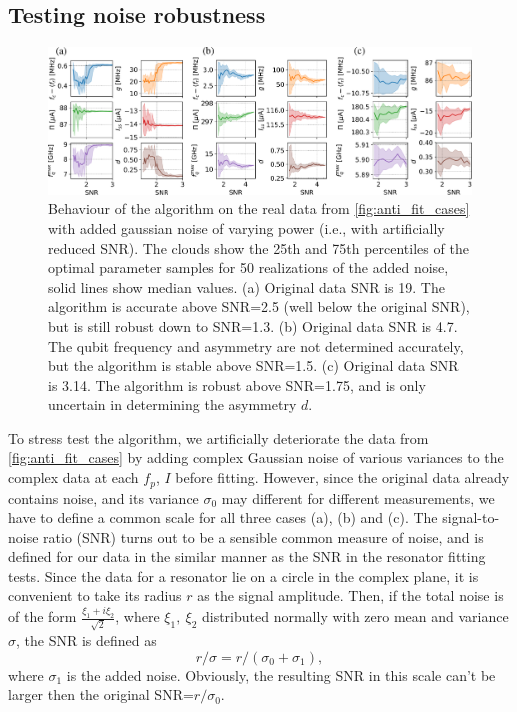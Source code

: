 \documentclass[%
 aip,
 draft,
 amsmath,amssymb,
 reprint,%
]{revtex4-1}
\begin{document}
\subsection{Testing noise robustness}

\begin{figure}
	\centering
	\includegraphics[width=\linewidth]{noise_test}
	\caption{Behaviour of the algorithm on the real data from \autoref{fig:anti_fit_cases} with added gaussian noise of varying power (i.e., with artificially reduced SNR). The clouds show the 25th and 75th percentiles of the optimal parameter samples for 50 realizations of the added noise, solid lines show median values. (a) Original data SNR is 19. The algorithm is accurate above SNR=2.5 (well below the original SNR), but is still robust down to SNR=1.3. (b) Original data SNR is 4.7. The qubit frequency and asymmetry are not determined accurately, but the algorithm is stable above SNR=1.5. (c) Original data SNR is 3.14. The algorithm is robust above SNR=1.75, and is only uncertain in determining the asymmetry $d$.}
	\label{fig:noise_test}
\end{figure}

To stress test the algorithm, we artificially deteriorate the data from \autoref{fig:anti_fit_cases} by adding complex Gaussian noise of various variances to the complex data at each $f_p$, $I$ before fitting. However, since the original data already contains noise, and its variance $\sigma_0$ may different for different measurements, we have to define a common scale for all three cases (a), (b) and (c). The signal-to-noise ratio (SNR) turns out to be a sensible common measure of noise, and is defined for our data in the similar manner as the SNR in the resonator fitting tests\cite{probst2015}. Since the data for a resonator lie on a circle in the complex plane, it is convenient to take its radius $r$ as the signal amplitude. Then, if the total noise is of the form $\frac{\xi_1+i\xi_2}{\sqrt 2}$, where $\xi_1,\ \xi_2$ distributed normally with zero mean and variance $\sigma$, the SNR is defined as 
\begin{equation}
r/\sigma = r/(\sigma_0+\sigma_1),
\label{eq:SNR}
\end{equation}
where $\sigma_1$ is the added noise. Obviously, the resulting SNR in this scale can't be larger then the original SNR=$r/\sigma_0$. 
\end{document}
